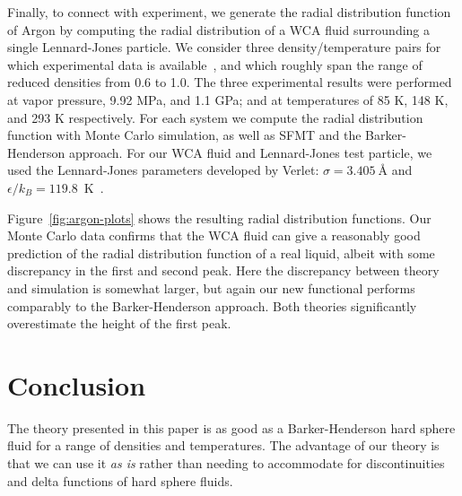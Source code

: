 \documentclass[letterpaper,twocolumn,amsmath,amssymb,prb]{revtex4-1}
\begin{document}
Finally, to connect with experiment, we generate the radial
distribution function of Argon by computing the radial distribution of
a WCA fluid surrounding a single Lennard-Jones particle.  We consider
three density/temperature pairs for which experimental data is
available~\cite{mikolaj2004structure, eggert2002quantitative,
yarnell1973structure}, and which roughly span the range of reduced
densities from 0.6 to 1.0. The three experimental results were
performed at vapor pressure, 9.92 MPa, and 1.1 GPa; and at
temperatures of 85 K, 148 K, and 293 K respectively. For each system we
compute the radial distribution function with Monte Carlo simulation,
as well as SFMT and the Barker-Henderson approach.  For our WCA fluid
and Lennard-Jones test particle, we used the Lennard-Jones parameters
developed by Verlet: $\sigma = 3.405 ~\textrm{\AA}$ and $\epsilon/k_B =
119.8$~K~\cite{verlet1967computer}.

Figure~\ref{fig:argon-plots} shows the resulting radial distribution
functions.  Our Monte Carlo data confirms that the WCA fluid can give
a reasonably good prediction of the radial distribution function of a
real liquid, albeit with some discrepancy in the first and second
peak.  Here the discrepancy between theory and simulation is somewhat
larger, but again our new functional performs comparably to the
Barker-Henderson approach.  Both theories significantly overestimate
the height of the first peak.


\section{Conclusion}

The theory presented in this paper is as good as a Barker-Henderson
hard sphere fluid for a range of densities and temperatures. The
advantage of our theory is that we can use it \emph{as is} rather than
needing to accommodate for discontinuities and delta functions of hard
sphere fluids.

 
\end{document}
